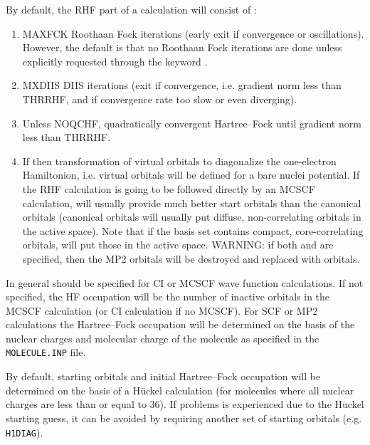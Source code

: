 By default, the RHF part of a {\sir} calculation will consist of :
\begin{enumerate}
\item {MAXFCK Roothaan Fock iterations (early exit if convergence
    or oscillations). However, the default is that no Roothaan Fock
iterations are done unless explicitly requested through the keyword
.
}
\item {MXDIIS DIIS iterations (exit if convergence, i.e. gradient norm
    less than THRRHF, and if convergence rate too slow or even diverging).
}
\item {Unless NOQCHF, quadratically convergent Hartree--Fock until
    gradient norm less than THRRHF.
}
\item{If  then transformation of
    virtual orbitals to diagonalize
    the one-electron Hamiltonion, i.e. virtual orbitals will be defined
    for a bare nuclei potential.
    If the RHF calculation is going to be followed
    directly by an MCSCF calculation,
     will usually provide much
    better start orbitals than the canonical orbitals (canonical
    orbitals will usually put diffuse, non-correlating orbitals in the
    active space).  Note that if the basis set contains compact,
    core-correlating orbitals,  will put those in the
    active space. 
    WARNING: if both  and  are specified,
    then the MP2 orbitals will be destroyed and replaced with 
    orbitals.
}
\end{enumerate}

In general  should be specified for CI or MCSCF
wave function calculations.  If not specified, the HF occupation
will be the number of inactive orbitals in the MCSCF calculation (or
CI calculation if no MCSCF). For SCF or MP2
calculations the Hartree--Fock occupation will be determined on the
basis of the nuclear charges and molecular charge of the molecule as
specified in the \verb|MOLECULE.INP| file.

By default, starting orbitals and initial Hartree--Fock occupation will
be determined on the basis of a H\"{u}ckel
calculation (for molecules where all nuclear charges are
less than or equal to 36). If problems is experienced due to the
Huckel starting guess, it can be avoided by requiring another set of
starting orbitals (e.g. \verb|H1DIAG|).

